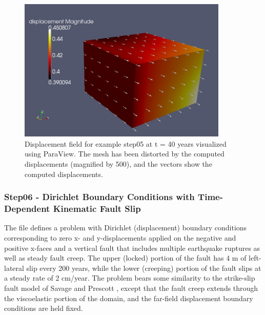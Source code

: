 \begin{figure}
  \includegraphics[width=10cm]{examples/figs/3dhex8_step05-displ-t40}
  \caption{Displacement field for example step05 at t = 40 years visualized using
    ParaView. The mesh has been distorted by the computed displacements
    (magnified by 500), and the vectors show the computed displacements.}
  \label{fig:example:3dhex8:step05:displacement}
\end{figure}


\subsubsection{Step06 - Dirichlet Boundary Conditions with Time-Dependent Kinematic Fault Slip}

The  file defines a problem with Dirichlet (displacement)
boundary conditions corresponding to zero x- and y-displacements applied
on the negative and positive x-faces and a vertical fault that includes
multiple earthquake ruptures as well as steady fault creep. The upper
(locked) portion of the fault has 4 m of left-lateral slip every 200
years, while the lower (creeping) portion of the fault slips at a
steady rate of 2 cm/year. The problem bears some similarity to the
strike-slip fault model of Savage and Prescott \cite{Savage:Prescott:1978},
except that the fault creep extends through the viscoelastic portion
of the domain, and the far-field displacement boundary conditions
are held fixed.


